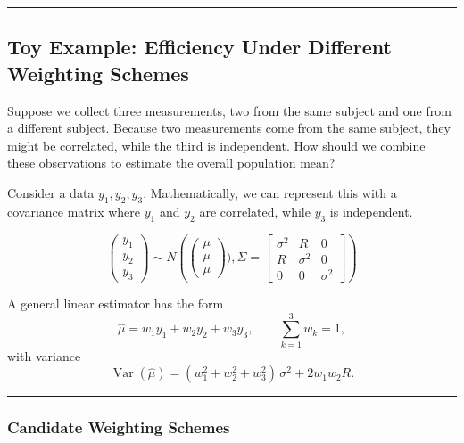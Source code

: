 \documentclass[
  letterpaper,
  DIV=11,
  numbers=noendperiod]{scrreprt}
\begin{document}
\begin{center}\rule{0.5\linewidth}{0.5pt}\end{center}

\hypertarget{toy-example-efficiency-under-different-weighting-schemes}{%
\subsection*{Toy Example: Efficiency Under Different Weighting
Schemes}\label{toy-example-efficiency-under-different-weighting-schemes}}

Suppose we collect three measurements, two from the same subject and one
from a different subject. Because two measurements come from the same
subject, they might be correlated, while the third is independent. How
should we combine these observations to estimate the overall population
mean?

Consider a data \(y_1, y_2, y_3\). Mathematically, we can represent this
with a covariance matrix where \(y_1\) and \(y_2\) are correlated, while
\(y_3\) is independent.

\[
\begin{pmatrix}
y_1 \\
y_2 \\
y_3
\end{pmatrix} \sim N \left(\begin{pmatrix}
\mu\\ 
\mu \\ 
\mu\end{pmatrix}), 
\Sigma = \begin{bmatrix}
\sigma^2  & R & 0\\
R & \sigma^2 & 0 \\
0 & 0 & \sigma^2 \end{bmatrix}
\right)
\]

A general linear estimator has the form \[
\hat\mu = w_1 y_1 + w_2 y_2 + w_3 y_3, \qquad \sum_{k=1}^3 w_k = 1,
\] with variance \[
\operatorname{Var}(\hat\mu) = (w_1^2+w_2^2+w_3^2)\,\sigma^2 + 2 w_1 w_2 R.
\]

\begin{center}\rule{0.5\linewidth}{0.5pt}\end{center}

\hypertarget{candidate-weighting-schemes}{%
\subsubsection*{Candidate Weighting
Schemes}\label{candidate-weighting-schemes}}
\end{document}
